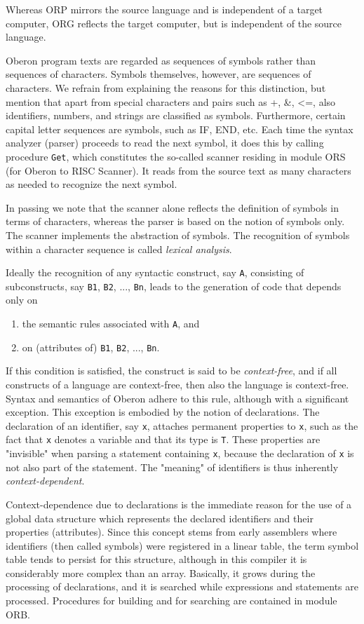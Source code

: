 Whereas ORP mirrors the source language and is independent of a target computer, ORG reflects
the target computer, but is independent of the source language.

Oberon program texts are regarded as sequences of symbols rather than sequences of characters.
Symbols themselves, however, are sequences of characters. We refrain from explaining the
reasons for this distinction, but mention that apart from special characters and pairs such as +, \&,
<=, also identifiers, numbers, and strings are classified as symbols. Furthermore, certain capital
letter sequences are symbols, such as IF, END, etc. Each time the syntax analyzer (parser)
proceeds to read the next symbol, it does this by calling procedure \verb|Get|, which constitutes
the so-called scanner residing in module ORS (for Oberon to RISC Scanner). It reads from the source
text as many characters as needed to recognize the next symbol.

In passing we note that the scanner alone reflects the definition of symbols in terms of characters,
whereas the parser is based on the notion of symbols only. The scanner implements the abstraction
of symbols. The recognition of symbols within a character sequence is called \emph{lexical analysis}.

Ideally the recognition of any syntactic construct, say \verb|A|, consisting of subconstructs, say
\verb|B1|, \verb|B2|, ..., \verb|Bn|, leads to the generation of code that depends only on
\begin{enumerate}
  \item the semantic rules associated with \verb|A|, and
  \item on (attributes of) \verb|B1|, \verb|B2|, ..., \verb|Bn|.
\end{enumerate}
If this condition is satisfied, the construct is said to be \emph{context-free}, and if all constructs
of a language are context-free, then also the language is context-free. Syntax and semantics of Oberon
adhere to this rule, although with a significant exception. This exception is embodied by the notion
of declarations. The declaration of an identifier, say \verb|x|, attaches permanent properties to
\verb|x|, such as the fact that \verb|x| denotes a variable and that its type is \verb|T|. These
properties are "invisible" when parsing a statement containing \verb|x|, because the declaration of
\verb|x| is not also part of the statement. The "meaning" of identifiers is thus inherently
\emph{context-dependent}.

Context-dependence due to declarations is the immediate reason for the use of a global data
structure which represents the declared identifiers and their properties (attributes). Since this
concept stems from early assemblers where identifiers (then called symbols) were registered in a
linear table, the term symbol table tends to persist for this structure, although in this compiler
it is considerably more complex than an array. Basically, it grows during the processing of
declarations, and it is searched while expressions and statements are processed. Procedures for
building and for searching are contained in module ORB.

